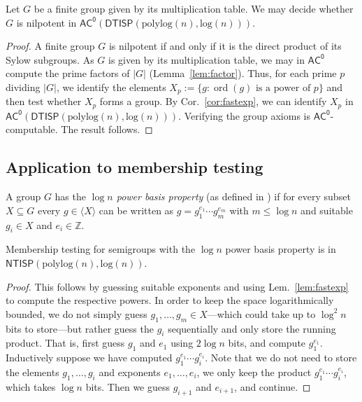 \documentclass{article}
\newcommand{\ord}[1]{\operatorname{ord}(#1)}
\newcommand{\Z}{\mathbb{Z}}
\newcommand{\Lem}[1]{Lem.~\ref{#1}\xspace}
\newcommand{\Cor}[1]{Cor.~\ref{#1}\xspace}
\newcommand*{\ComplexityClass}[1]{\ensuremath{\mathsf{#1}}\xspace}
\newcommand{\NTISP}{\ComplexityClass{NTISP}}
\newcommand{\DTISP}{\ComplexityClass{DTISP}}
\newcommand{\NTISPpll}{\ensuremath{\NTISP(\mathrm{polylog}(n),\mathrm{log}(n))}\xspace}
\newcommand{\DTISPpll}{\ensuremath{\DTISP(\mathrm{polylog}(n),\mathrm{log}(n))}\xspace}
\newcommand{\ACz}{\ComplexityClass{AC^0}}
\begin{document}
\begin{corollary}
Let $G$ be a finite group given by its multiplication table. We may decide whether $G$ is nilpotent in $\ACz(\DTISPpll)$.        
\end{corollary}

\begin{proof}
A finite group $G$ is nilpotent if and only if it is the direct product of its Sylow subgroups. As $G$ is given by its multiplication table, we may in $\ACz$ compute the prime factors of $|G|$ (Lemma~\ref{lem:factor}).  Thus, for each prime $p$ dividing $|G|$, we identify the elements $X_{p} := \{ g : \ord{g} \text{ is a power of } p \}$ and then test whether $X_{p}$ forms a group. By \Cor{cor:fastexp}, we can identify $X_{p}$ in $\ACz(\DTISPpll)$. Verifying the group axioms is $\ACz$-computable. The result follows.
\end{proof}

\subsection{Application to membership testing}
A group $G$ has the \emph{$\log n$ power basis property} (as defined in \cite{BKLM,Fleischer}) if for every subset $X \subseteq G$ every $g \in \langle X \rangle$ can be written as $g = g_1^{e_1} \cdots g_m^{e_m}$ with $m \leq \log n$ and suitable $g_i \in X$ and $e_i \in \Z$.

\begin{observation} \label{obs:logpowerbasis}
    Membership testing for semigroups with the $\log n$ power basis property is in $\NTISPpll$. 
\end{observation}

\begin{proof}
This follows by guessing suitable exponents and using \Lem{lem:fastexp} to compute the respective powers. In order to keep the space logarithmically bounded, we do not simply guess $g_1, \dotsc, g_m \in X$---which could take up to $\log^2 n$ bits to store---but rather guess the $g_i$ sequentially and only store the running product. That is, first guess $g_1$ and $e_1$ using $2 \log n$ bits, and compute $g_1^{e_1}$. Inductively suppose we have computed $g_1^{e_1} \dotsb g_i^{e_i}$. Note that we do not need to store the elements $g_1, \dotsc, g_i$ and exponents $e_1,\dotsc,e_i$, we only keep the product $g_1^{e_1} \dotsb g_i^{e_i}$, which takes $\log n$ bits. Then we guess $g_{i+1}$ and $e_{i+1}$, and continue.
\end{proof}
\end{document}
